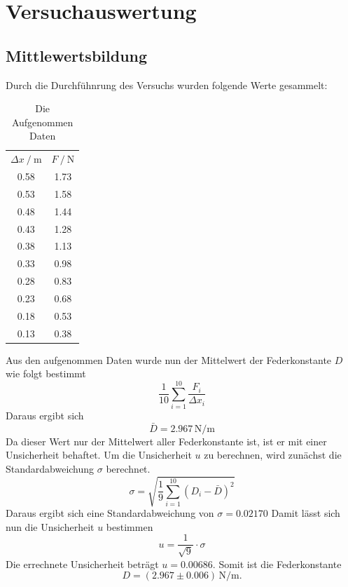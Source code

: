   \section{Versuchauswertung}
  \subsection{Mittlewertsbildung}
Durch die Durchfühnrung des Versuchs wurden folgende Werte gesammelt:
\begin{table}
  \centering
  \caption{Die Aufgenommen Daten}
  \label{tab:Messdaten}
  \begin{tabular}{c c}
  \toprule
  $ \Delta x \:/\: \si{\meter}$ & $F \:/\: \si{\newton}$ \\
  0.58 & 1.73 \\
  0.53 & 1.58 \\
  0.48 & 1.44 \\
  0.43 & 1.28 \\
  0.38 & 1.13 \\
  0.33 & 0.98 \\
  0.28 & 0.83 \\
  0.23 & 0.68 \\
  0.18 & 0.53 \\
  0.13 & 0.38 \\
  \bottomrule
  \end{tabular}
\end{table}
\FloatBarrier
Aus den aufgenommen Daten wurde nun der Mittelwert der Federkonstante $D$ wie folgt bestimmt
\begin{equation}
\frac{1}{10} \sum_{i=1}^{10} \frac{F_i}{\Delta x_i}
\end{equation}
Daraus ergibt sich
\begin{equation}
\bar{D} = 2.967 \,\mathrm{N/m}
\end{equation}
Da dieser Wert nur der Mittelwert aller Federkonstante ist, ist er mit einer Unsicherheit behaftet.
Um die Unsicherheit $u$ zu berechnen, wird zunächst die Standardabweichung $\sigma$ berechnet.
\begin{equation}
\sigma = \sqrt{\frac{1}{9} \sum_{i=1}^{10} (D_i - \bar{D})^2}
\end{equation}
Daraus ergibt sich eine Standardabweichung von $\sigma = 0.02170$
Damit lässt sich nun die Unsicherheit $u$ bestimmen
\begin{equation}
u = \frac{1}{ \sqrt{9}} \cdot \sigma
\end{equation}
Die errechnete Unsicherheit beträgt $u = 0.00686$.
Somit ist die Federkonstante 
\begin{equation}
D = (2.967 \pm 0.006)\,\mathrm{N/m}.
\end{equation}
\newpage
